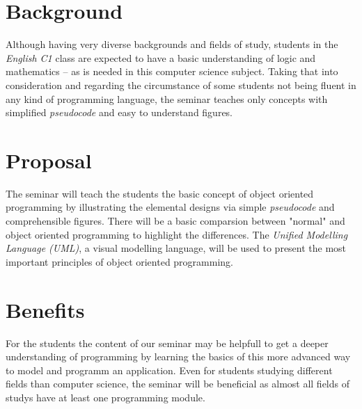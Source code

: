 \section*{Background}
Although having very diverse backgrounds and fields of study, students in the \emph{English C1} class are expected to have a basic understanding of logic and mathematics -- as is needed in this computer science subject. Taking that into consideration and regarding the circumstance of some students not being fluent in any kind of programming language, the seminar teaches only concepts with simplified \emph{pseudocode} and easy to understand figures.
\section*{Proposal}
The seminar will teach the students the basic concept of object oriented programming by illustrating the elemental designs via simple \emph{pseudocode} and comprehensible figures. There will be a basic comparsion between "normal" and object oriented programming to highlight the differences. The \emph{Unified Modelling Language (UML)}, a visual modelling language, will be used to present the most important principles of object oriented programming.
\section*{Benefits}
For the students the content of our seminar may be helpfull to get a deeper understanding of programming by learning the basics of this more advanced way to model and programm an application. Even for students studying different fields than computer science, the seminar will be beneficial as almost all fields of studys have at least one programming module.


